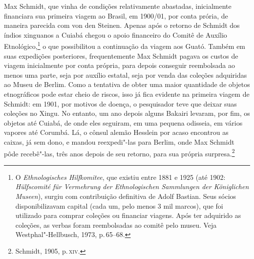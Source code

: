 Max Schmidt, que vinha de condições relativamente abastadas,
inicialmente financiara sua primeira viagem ao Brasil, em 1900/01, por
conta prória, de maneira parecida com von den Steinen. Apenas após o
retorno de Schmidt dos índios xinguanos a Cuiabá chegou o apoio
financeiro do Comitê de Auxílio Etnológico,\footnote{O \textit{Ethnologisches Hilfkomitee}, que existiu
  entre 1881 e 1925 (até 1902: \textit{Hülfscomité für Vermehrung der
  Ethnologischen Sammlungen der Königlichen Museen}), surgiu
  com contribuição definitiva de Adolf Bastian. Seus sócios
  disponibilizavam capital (cada um, pelo menos 3 mil marcos), que foi
  utilizado para comprar coleções ou financiar viagens. Após ter
  adquirido as coleções, as verbas foram reembolsadas ao comitê pelo
  museu. Veja Westphal"-Hellbusch, 1973, p.\,65--68.} o que possibilitou a
continuação da viagem aos Guató. Também em suas expedições posteriores,
frequentemente Max Schmidt pagava os custos de viagem inicialmente por
conta própria, para depois conseguir reembolsada ao menos uma parte,
seja por auxílio estatal, seja por venda das coleções adquiridas ao
Museu de Berlim. Como a tentativa de obter uma maior quantidade de
objetos etnográficos pode estar cheio de riscos, isso já fica evidente
na primeira viagem de Schmidt: em 1901, por motivos de doença, o
pesquisador teve que deixar suas coleções no Xingu. No entanto, um ano
depois alguns Bakairi levaram, por fim, os objetos até Cuiabá, de onde
eles seguiram, em uma pequena odisseia, em vários vapores até Corumbá.
Lá, o cônsul alemão Hesslein por acaso encontrou as caixas, já sem dono,
e mandou reexpedi"-las para Berlim, onde Max Schmidt pôde recebê"-las,
três anos depois de seu retorno, para sua própria surpresa.\footnote{Schmidt,
1905, p.\,\textsc{xiv}.}

